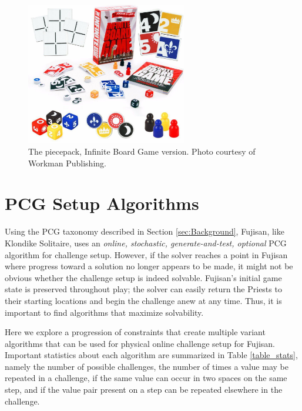 \documentclass[10pt,journal,compsoc]{IEEEtran}
\begin{document}
\begin{figure}[t]
\centering
\includegraphics[width=7cm]{infinite2.jpg}
\caption{The piecepack, Infinite Board Game version. Photo courtesy of Workman
Publishing.}
\label{fig:piecepackinfinite}
\end{figure}

\section{PCG Setup Algorithms} \label{section:pcgalgs}

\noindent
Using the PCG taxonomy described in Section \ref{sec:Background}, Fujisan, like Klondike Solitaire, uses an {\it online, stochastic, generate-and-test, optional} PCG algorithm for challenge setup. However, if the solver reaches a point in Fujisan where progress toward a solution no longer appears to be made, it might not be obvious whether the challenge setup is indeed solvable. Fujisan's initial game state is preserved throughout play; the solver can easily return the Priests to their starting locations and begin the challenge anew at any time. Thus, it is important to find algorithms that maximize solvability.

Here we explore a progression of constraints that create multiple variant algorithms that can be used for physical online challenge setup for Fujisan. Important statistics about each algorithm are summarized in Table \ref{table_stats}, namely the number of possible challenges, the number of times a value may be repeated in a challenge, if the same value can occur in two spaces on the same step, and if the value pair present on a step can be repeated elsewhere in the challenge.
\end{document}
